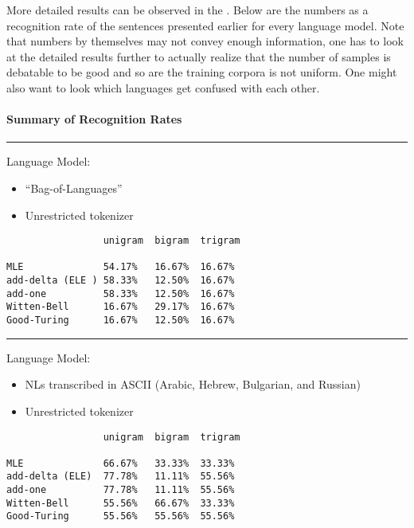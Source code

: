More detailed results can be observed in the .
Below are the numbers as a recognition rate of the
sentences presented earlier for every language model.
Note that numbers by themselves may not convey
enough information, one has to look at the detailed results further
to actually realize that the number of samples is debatable
to be good and so are the training corpora is not
uniform. One might also want to look which languages
get confused with each other.

\paragraph{Summary of Recognition Rates}

\vspace{15pt}
\hrule
\vspace{15pt}

Language Model:

\begin{itemize}
\item ``Bag-of-Languages''
\item Unrestricted tokenizer
\end{itemize}

\begin{verbatim}
                 unigram  bigram  trigram

MLE              54.17%   16.67%  16.67%
add-delta (ELE ) 58.33%   12.50%  16.67%
add-one          58.33%   12.50%  16.67%
Witten-Bell      16.67%   29.17%  16.67%
Good-Turing      16.67%   12.50%  16.67%
\end{verbatim}

\vspace{15pt}
\hrule
\vspace{15pt}

Language Model:

\begin{itemize}
\item NLs transcribed in ASCII (Arabic, Hebrew, Bulgarian, and Russian)
\item Unrestricted tokenizer
\end{itemize}

\begin{verbatim}
                 unigram  bigram  trigram

MLE              66.67%   33.33%  33.33%
add-delta (ELE)  77.78%   11.11%  55.56%
add-one          77.78%   11.11%  55.56%
Witten-Bell      55.56%   66.67%  33.33%
Good-Turing      55.56%   55.56%  55.56%
\end{verbatim}

